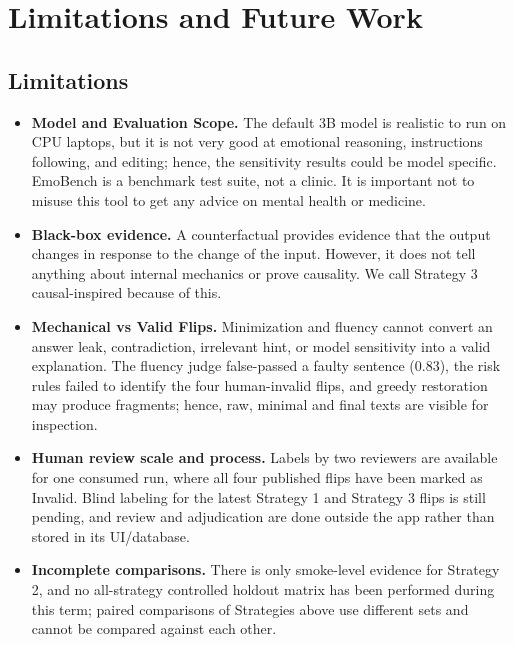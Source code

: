\documentclass[11pt,a4paper]{article}
\begin{document}
\section{Limitations and Future Work}

\subsection{Limitations}

\begin{itemize}
  \item \textbf{Model and Evaluation Scope.} The default 3B model is realistic to run
  on CPU laptops, but it is not very good at emotional reasoning, instructions
  following, and editing; hence, the sensitivity results could be model specific.
  EmoBench is a benchmark test suite, not a clinic. It is important not to misuse this
  tool to get any advice on mental health or medicine.
  \item \textbf{Black-box evidence.} A counterfactual provides evidence that the output
  changes in response to the change of the input. However, it does not tell anything
  about internal mechanics or prove causality. We call Strategy 3 causal-inspired
  because of this.
  \item \textbf{Mechanical vs Valid Flips.} Minimization and fluency cannot convert an
  answer leak, contradiction, irrelevant hint, or model sensitivity into a valid
  explanation. The fluency judge false-passed a faulty sentence (0.83), the risk rules
  failed to identify the four human-invalid flips, and greedy restoration may produce
  fragments; hence, raw, minimal and final texts are visible for inspection.
  \item \textbf{Human review scale and process.} Labels by two reviewers are available
  for one consumed run, where all four published flips have been marked as Invalid.
  Blind labeling for the latest Strategy 1 and Strategy 3 flips is still pending, and
  review and adjudication are done outside the app rather than stored in its
  UI/database.
  \item \textbf{Incomplete comparisons.} There is only smoke-level evidence for
  Strategy 2, and no all-strategy controlled holdout matrix has been performed during
  this term; paired comparisons of Strategies above use different sets and cannot be
  compared against each other.

\end{itemize}
\end{document}
